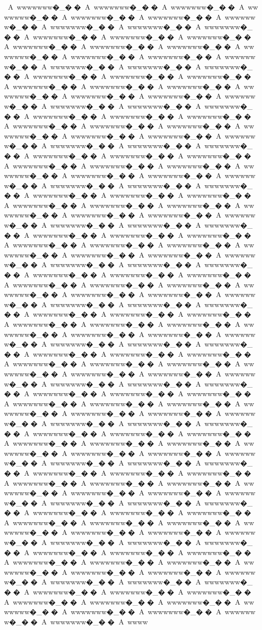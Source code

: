 {{{{{{{{{{{{{{{{{{{{{{{{{{{{{{{{{{{{{{{{{{{{{{{{{{{{{{{{{{{{{{{{{{{{{{{{{{{{{{{{A~wwwwwww�_��A~wwwwwww�_��A~wwwwwww�_��A~wwwwwww�_��A~wwwwwww�_��A~wwwwwww�_��A~wwwwwww�_��A~wwwwwww�_��A~wwwwwww�_��A~wwwwwww�_��A~wwwwwww�_��A~wwwwwww�_��A~wwwwwww�_��A~wwwwwww�_��A~wwwwwww�_��A~wwwwwww�_��A~wwwwwww�_��A~wwwwwww�_��A~wwwwwww�_��A~wwwwwww�_��A~wwwwwww�_��A~wwwwwww�_��A~wwwwwww�_��A~wwwwwww�_��A~wwwwwww�_��A~wwwwwww�_��A~wwwwwww�_��A~wwwwwww�_��A~wwwwwww�_��A~wwwwwww�_��A~wwwwwww�_��A~wwwwwww�_��A~wwwwwww�_��A~wwwwwww�_��A~wwwwwww�_��A~wwwwwww�_��A~wwwwwww�_��A~wwwwwww�_��A~wwwwwww�_��A~wwwwwww�_��A~wwwwwww�_��A~wwwwwww�_��A~wwwwwww�_��A~wwwwwww�_��A~wwwwwww�_��A~wwwwwww�_��A~wwwwwww�_��A~wwwwwww�_��A~wwwwwww�_��A~wwwwwww�_��A~wwwwwww�_��A~wwwwwww�_��A~wwwwwww�_��A~wwwwwww�_��A~wwwwwww�_��A~wwwwwww�_��A~wwwwwww�_��A~wwwwwww�_��A~wwwwwww�_��A~wwwwwww�_��A~wwwwwww�_��A~wwwwwww�_��A~wwwwwww�_��A~wwwwwww�_��A~wwwwwww�_��A~wwwwwww�_��A~wwwwwww�_��A~wwwwwww�_��A~wwwwwww�_��A~wwwwwww�_��A~wwwwwww�_��A~wwwwwww�_��A~wwwwwww�_��A~wwwwwww�_��A~wwwwwww�_��A~wwwwwww�_��A~wwwwwww�_��A~wwwwwww�_��A~wwwwwww�_��A~wwwwwww�_��A~wwwwwww�_��A~wwwwwww�_��A~wwwwwww�_��A~wwwwwww�_��A~wwwwwww�_��A~wwwwwww�_��A~wwwwwww�_��A~wwwwwww�_��A~wwwwwww�_��A~wwwwwww�_��A~wwwwwww�_��A~wwwwwww�_��A~wwwwwww�_��A~wwwwwww�_��A~wwwwwww�_��A~wwwwwww�_��A~wwwwwww�_��A~wwwwwww�_��A~wwwwwww�_��A~wwwwwww�_��A~wwwwwww�_��A~wwwwwww�_��A~wwwwwww�_��A~wwwwwww�_��A~wwwwwww�_��A~wwwwwww�_��A~wwwwwww�_��A~wwwwwww�_��A~wwwwwww�_��A~wwwwwww�_��A~wwwwwww�_��A~wwwwwww�_��A~wwwwwww�_��A~wwwwwww�_��A~wwwwwww�_��A~wwwwwww�_��A~wwwwwww�_��A~wwwwwww�_��A~wwwwwww�_��A~wwwwwww�_��A~wwwwwww�_��A~wwwwwww�_��A~wwwwwww�_��A~wwwwwww�_��A~wwwwwww�_��A~wwwwwww�_��A~wwwwwww�_��A~wwwwwww�_��A~wwwwwww�_��A~wwwwwww�_��A~wwwwwww�_��A~wwwwwww�_��A~wwwwwww�_��A~wwwwwww�_��A~wwwwwww�_��A~wwwwwww�_��A~wwwwwww�_��A~wwwwwww�_��A~wwwwwww�_��A~wwwwwww�_��A~wwwwwww�_��A~wwwwwww�_��A~wwwwwww�_��A~wwwwwww�_��A~wwwwwww�_��A~wwwwwww�_��A~wwwwwww�_��A~wwwwwww�_��A~wwwwwww�_��A~wwwwwww�_��A~wwwwwww�_��A~wwwwwww�_��A~wwwwwww�_��A~wwwwwww�_��A~wwwwwww�_��A~wwwwwww�_��A~wwwwwww�_��A~wwwwwww�_��A~wwwwwww�_��A~wwwwwww�_��A~wwwwwww�_��A~wwwwwww�_��A~wwwwwww�_��A~wwwwwww�_��A~wwwwwww�_��A~wwwwwww�_��A~wwwwwww�_��A~wwwwwww�_��A~wwwwwww�_��A~wwwwwww�_��A~wwwwwww�_��A~wwwwwww�_��A~wwwwwww�_��A~wwwwwww�_��A~wwwwwww�_��A~wwwwwww�_��A~wwwwwww�_��A~wwwwwww�_��A~wwwwwww�_��A~wwwwwww�_��A~wwwwwww�_��A~wwwwwww�_��A~wwwwwww�_��A~wwwwwww�_��A~wwwwwww�_��A~wwwwwww�_��A~wwwwwww�_��A~wwwwwww�_��A~wwwwwww�_��A~wwwwwww�_��A~wwwwwww�_��A~wwwwwww�_��A~wwwwwww�_��A~wwwwwww�_��A~wwwwwww�_��A~wwwwwww�_��A~wwwwwww�_��A~wwwwwww�_��A~wwwwwww�_��A~wwwwwww�_��A~wwwwwww�_��A~wwwwwww�_��A~wwwwwww�_��A~wwww}}}}}}}}}}}}}}}}}}}}}}}}}}}}}}}}}}}}}}}}}}}}}}}}}}}}}}}}}}}}}}}}}}}}}}}}}}}}}}}}

